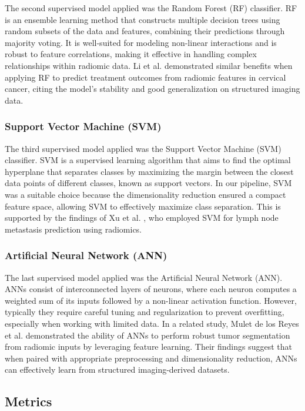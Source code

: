 The second supervised model applied was the Random Forest (RF) classifier. RF
is an ensemble learning method that constructs multiple decision trees using
random subsets of the data and features, combining their predictions through
majority voting. It is well-suited for modeling non-linear interactions and is
robust to feature correlations, making it effective in handling complex
relationships within radiomic data. Li et al. \cite{li2020rf} demonstrated
similar benefits when applying RF to predict treatment outcomes from radiomic
features in cervical cancer, citing the model’s stability and good
generalization on structured imaging data.

\subsubsection{Support Vector Machine (SVM)}

The third supervised model applied was the Support Vector Machine (SVM)
classifier. SVM is a supervised learning algorithm that aims to find the
optimal hyperplane that separates classes by maximizing the margin between the
closest data points of different classes, known as support vectors. In our
pipeline, SVM was a suitable choice because the dimensionality reduction
ensured a compact feature space, allowing SVM to effectively maximize class
separation. This is supported by the findings of Xu et al. \cite{xu2019svm},
who employed SVM for lymph node metastasis prediction using radiomics.

\subsubsection{Artificial Neural Network (ANN)}

The last supervised model applied was the Artificial Neural Network (ANN). ANNs
consist of interconnected layers of neurons, where each neuron computes a
weighted sum of its inputs followed by a non-linear activation function.
However, typically they require careful tuning and regularization to prevent
overfitting, especially when working with limited data. In a related study,
Mulet de los Reyes et al. \cite{mulet2023ann} demonstrated the ability of ANNs
to perform robust tumor segmentation from radiomic inputs by leveraging feature
learning. Their findings suggest that when paired with appropriate
preprocessing and dimensionality reduction, ANNs can effectively learn from
structured imaging-derived datasets.

\subsection{Metrics}

